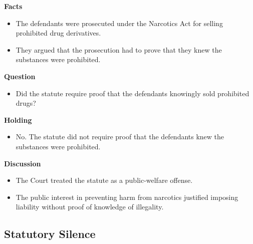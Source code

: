\documentclass[11pt]{tex/lawoutline}
\begin{document}
{}
{
\textbf{Facts}
\begin{itemize}
    \item The defendants were prosecuted under the Narcotics Act for selling prohibited drug derivatives.
    \item They argued that the prosecution had to prove that they knew the substances were prohibited.
\end{itemize}

\textbf{Question}
\begin{itemize}
    \item Did the statute require proof that the defendants knowingly sold prohibited drugs?
\end{itemize}

\textbf{Holding}
\begin{itemize}
    \item No. The statute did not require proof that the defendants knew the substances were prohibited.
\end{itemize}

\textbf{Discussion}
\begin{itemize}
    \item The Court treated the statute as a public-welfare offense.
    \item The public interest in preventing harm from narcotics justified imposing liability without proof of knowledge of illegality.
\end{itemize}
}

\subsection{Statutory Silence}
\end{document}
